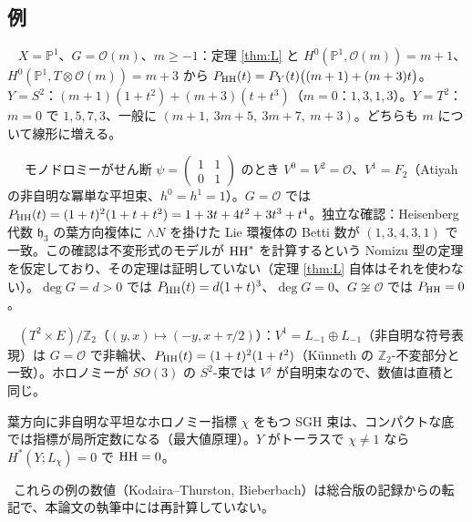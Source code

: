 \subsection{例}
\begin{ex}\tP\ \tV\label{ex:prodY}
$X=\mathbb P^1$、$G=\mathcal O(m)$、$m\ge-1$：定理 \ref{thm:L} と $H^0(\mathbb P^1,\mathcal O(m))=m+1$、$H^0(\mathbb P^1,T\otimes\mathcal O(m))=m+3$ から $P_{\mathrm{HH}}(t)=P_Y(t)\bigl((m+1)+(m+3)t\bigr)$。$Y=S^2$：$(m+1)(1+t^2)+(m+3)(t+t^3)$（$m=0$：$1,3,1,3$）。$Y=T^2$：$m=0$ で $1,5,7,3$、一般に $(m+1,\ 3m+5,\ 3m+7,\ m+3)$。どちらも $m$ について線形に増える。
\end{ex}
\begin{ex}\tP\ \tV\ \tQ
モノドロミーがせん断 $\psi=\begin{pmatrix}1&1\\0&1\end{pmatrix}$ のとき $V^0=V^2=\mathcal O$、$V^1=F_2$（Atiyah \cite{Atiyah} の非自明な冪単な平坦束、$h^0=h^1=1$\tC）。$G=\mathcal O$ では $P_{\mathrm{HH}}(t)=(1+t)^2(1+t+t^2)=1+3t+4t^2+3t^3+t^4$。独立な確認：Heisenberg 代数 $\mathfrak h_3$ の葉方向複体に $\wedge N$ を掛けた Lie 環複体の Betti 数が $(1,3,4,3,1)$ で一致\tV。この確認は不変形式のモデルが $\mathrm{HH}^*$ を計算するという Nomizu 型の定理を仮定しており、その定理は証明していない\tQ（定理 \ref{thm:L} 自体はそれを使わない）。$\deg G=d>0$ では $P_{\mathrm{HH}}(t)=d(1+t)^3$、$\deg G=0$、$G\not\cong\mathcal O$ では $P_{\mathrm{HH}}=0$。
\end{ex}
\begin{ex}[Bieberbach 商、$S^2$-束]\tP\ \tV
$(T^2\times E)/\mathbb Z_2$（$(y,x)\mapsto(-y,x+\tau/2)$）：$V^1=L_{-1}\oplus L_{-1}$（非自明な符号表現）は $G=\mathcal O$ で非輪状、$P_{\mathrm{HH}}(t)=(1+t)^2(1+t^2)$（Künneth の $\mathbb Z_2$-不変部分と一致）。ホロノミーが $SO(3)$ の $S^2$-束では $V^j$ が自明束なので、数値は直積と同じ。
\end{ex}
\begin{rem}\tP
葉方向に非自明な平坦なホロノミー指標 $\chi$ をもつ SGH 束は、コンパクトな底では指標が局所定数になる（最大値原理）。$Y$ がトーラスで $\chi\ne1$ なら $H^*(Y;L_\chi)=0$ で $\mathrm{HH}=0$。
\end{rem}
\tC\ これらの例の数値（Kodaira--Thurston, Bieberbach）は総合版の記録からの転記で、本論文の執筆中には再計算していない\tQ。

